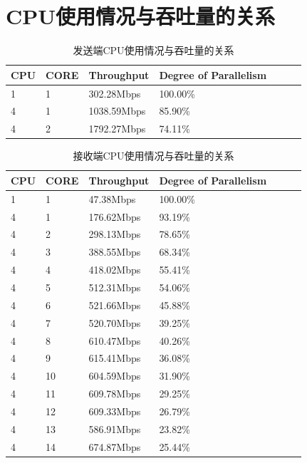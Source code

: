 \documentclass{article}
\begin{document}
\section{CPU使用情况与吞吐量的关系}
\begin{table}[H]
	\caption{发送端CPU使用情况与吞吐量的关系}
	\centering
	\begin{tabular}{|l|l|l|l|l|l|l|}%
		\hline  %
		CPU		& CORE		& Throughput	& Degree of Parallelism	\\
		\hline
		1		& 1			& 302.28Mbps	& 100.00\%				\\
		\hline
		4		& 1			& 1038.59Mbps	& 85.90\%				\\
		\hline
		4		& 2			& 1792.27Mbps	& 74.11\%				\\
		\hline  %
	\end{tabular}
\end{table}
\begin{table}[H]
	\caption{接收端CPU使用情况与吞吐量的关系}
	\centering
	\begin{tabular}{|l|l|l|l|l|l|l|}%
		\hline  %
		CPU		& CORE		& Throughput	& Degree of Parallelism	\\
		\hline
		1		& 1			& 47.38Mbps		& 100.00\%				\\
		\hline
		4		& 1			& 176.62Mbps	& 93.19\%				\\
		\hline
		4		& 2			& 298.13Mbps	& 78.65\%				\\
		\hline
		4		& 3			& 388.55Mbps	& 68.34\%				\\
		\hline
		4		& 4			& 418.02Mbps	& 55.41\%				\\
		\hline
		4		& 5			& 512.31Mbps	& 54.06\%				\\
		\hline
		4		& 6			& 521.66Mbps	& 45.88\%				\\
		\hline
		4		& 7			& 520.70Mbps	& 39.25\%				\\
		\hline
		4		& 8			& 610.47Mbps	& 40.26\%				\\
		\hline
		4		& 9			& 615.41Mbps	& 36.08\%				\\
		\hline
		4		& 10		& 604.59Mbps	& 31.90\%				\\
		\hline
		4		& 11		& 609.78Mbps	& 29.25\%				\\
		\hline
		4		& 12		& 609.33Mbps	& 26.79\%				\\
		\hline
		4		& 13		& 586.91Mbps	& 23.82\%				\\
		\hline
		4		& 14		& 674.87Mbps	& 25.44\%				\\
		\hline  %
	\end{tabular}
\end{table}
\end{document}

